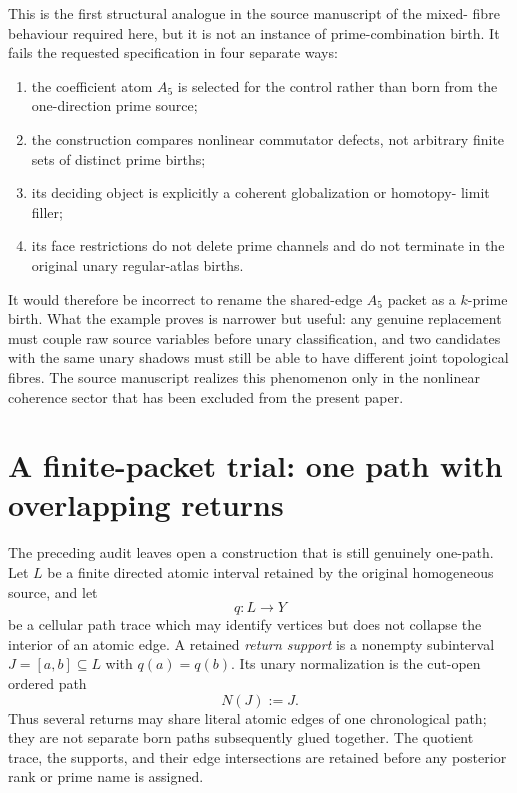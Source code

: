 \documentclass[11pt]{article}
\begin{document}
This is the first structural analogue in the source manuscript of the mixed-
fibre behaviour required here, but it is not an instance of prime-combination
birth.  It fails the requested specification in four separate ways:

\begin{enumerate}[label=(\roman*)]
\item the coefficient atom \(A_5\) is selected for the control rather than born
from the one-direction prime source;
\item the construction compares nonlinear commutator defects, not arbitrary
finite sets of distinct prime births;
\item its deciding object is explicitly a coherent globalization or homotopy-
limit filler;
\item its face restrictions do not delete prime channels and do not terminate
in the original unary regular-atlas births.
\end{enumerate}

It would therefore be incorrect to rename the shared-edge \(A_5\) packet as a
\(k\)-prime birth.  What the example proves is narrower but useful: any genuine
replacement must couple raw source variables before unary classification, and
two candidates with the same unary shadows must still be able to have different
joint topological fibres.  The source manuscript realizes this phenomenon only
in the nonlinear coherence sector that has been excluded from the present
paper.

\section{A finite-packet trial: one path with overlapping returns}

The preceding audit leaves open a construction that is still genuinely
one-path.  Let \(L\) be a finite directed atomic interval retained by the
original homogeneous source, and let
\[
q:L\longrightarrow Y
\]
be a cellular path trace which may identify vertices but does not collapse the
interior of an atomic edge.  A retained \emph{return support} is a nonempty
subinterval \(J=[a,b]\subseteq L\) with \(q(a)=q(b)\).  Its unary normalization
is the cut-open ordered path
\[
N(J):=J.
\]
Thus several returns may share literal atomic edges of one chronological path;
they are not separate born paths subsequently glued together.  The quotient
trace, the supports, and their edge intersections are retained before any
posterior rank or prime name is assigned.
\end{document}
